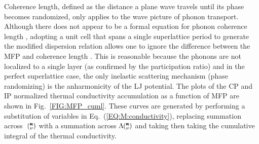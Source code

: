 Coherence length, defined as the distance a plane wave travels until its phase becomes randomized, only applies to the wave picture of phonon transport. Although there does not appear to be a formal equation for phonon coherence length \cite{chen2005nanoscale}, adopting a unit cell that spans a single superlattice period to generate the modified dispersion relation allows one to ignore the difference between the MFP and coherence length \cite{PhysRevB.67.195311}. This is reasonable because the phonons are not localized to a single layer (as confirmed by the participation ratio) and in the perfect superlattice case, the only inelastic scattering mechanism (phase randomizing) is the anharmonicity of the LJ potential. The plots of the CP and IP normalized thermal conductivity accumulation as a function of MFP are shown in Fig.~\ref{FIG:MFP_cuml}. These curves are generated by performing a substitution of variables in Eq.~(\ref{EQ:M:conductivity}), replacing summation across ~$\mspace{-4.0mu}\left(\mspace{-8.0mu} \begin{smallmatrix}&\pmb{\kappa} \\&\nu\end{smallmatrix} \mspace{-3.0mu}\right)$ with a summation across $\Lambda \mspace{-4.0mu}\left(\mspace{-8.0mu} \begin{smallmatrix}&\pmb{\kappa} \\&\nu\end{smallmatrix} \mspace{-3.0mu}\right)$ and taking then taking the cumulative integral of the thermal conductivity.

\begin{comment}
The plots of the CP thermal conductivity MFP contribution curves, defined by
\begin{equation}\label{EQ:MFP_contr}
\begin{split}
dk_{\alpha}(\Lambda \kv)=c_{ph}\kv v^2_{g,\alpha}\kv \frac{\Lambda \kv} {|\pmb{\mathrm{v}}_{g}\kv|} d\Lambda \kv, 
\end{split}
\end{equation}
is shown in Fig.~\ref{FIG:MFP_cp}. 
\begin{figure}%
\begin{center}
\scalebox{1}{ \texttt{[image: MFP\_cp.eps]}}
\renewcommand{\figure}{Fig.}
\caption{Phonon mean free path normalized by the period length contribution to the cross-plane thermal conductivity. Color corresponds to those used in Fig.~\ref{FIG:lifetime}. Average MFP is reported. Orange corresponds to lighter bulk and green corresponds to heavier bulk.}
\label{FIG:MFP_cp}
\end{center}
\end{figure}
There is a clear reduction in the contribution to cross-plane thermal conductivity in perfect superlattices from modes with a MFP greater than the period length as period length increases. This trend is consistent with the theoretical predictions from Mahan that a minimum thermal conductivity occurs as the transport behaviour shifts from a wave-regime to particle-regime when the average MFP transitions from being greater than the period length to being less than the period length.\cite{PhysRevLett.84.927,PhysRevB.56.10754} This same trend is observed in the contribution curves for the in-plane conductivity (not shown). The minimum cross-plane thermal conductivity for perfect superlattices occurs at a point where the average MFP is greater than the period length ($4 \times 4$), as described by Mahan.\cite{PhysRevLett.84.927} 
\end{comment}

